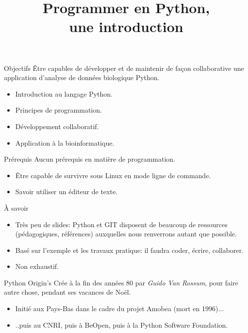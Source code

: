 \documentclass{beamer}
\title{Programmer en Python,\\ une introduction}
\begin{document}
\begin{frame}
  \titlepage
\end{frame}

\begin{frame}{Objectifs}
  Être capables de développer et de maintenir de façon collaborative une application d'analyse de données biologique Python.
  
  \begin{itemize}
  \item Introduction au langage Python.
  \item Principes de programmation.
  \item Développement collaboratif.
  \item Application à la bio\-informatique. 
  \end{itemize}
\end{frame}

\begin{frame}{Prérequis}
  Aucun prérequis en matière de programmation.
  
  \begin{itemize}
  \item Être capable de survivre sous Linux en mode ligne de commande.
  \item Savoir utiliser un éditeur de texte.
  \end{itemize}
\end{frame}

\begin{frame}{À savoir}
  \begin{itemize}
  \item Très peu de slides: Python et GIT disposent de beaucoup de ressources (pédagogiques, références) auxquelles nous renverrons autant que possible.
  \item Basé sur l'exemple et les travaux pratique: il faudra coder, écrire, collaborer.
  \item Non exhaustif.
  \end{itemize}
\end{frame}

\begin{frame}{Python Origin's}
  Crée à la fin des années 80 par {\em Guido Van Rossum}, pour faire autre chose, pendant ses vacances de Noël.
  \begin{itemize}
  \item Initié aux Pays-Bas dans le cadre du projet Amobea (mort en 1996)...
  \item ..puis au CNRI, puis à BeOpen, puis à la Python Software Foundation.
  \end{itemize}
\end{frame}
\end{document}
